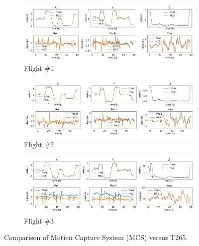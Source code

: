 \begin{figure}[!ht]
  \centering
  \begin{subfigure}[t]{.90\linewidth}
    \centering  \includegraphics[width=.99\linewidth]{chapter_7_experiments/imgs/t265_gt_graphs_flight_1.pdf}
    \caption{\label{fig:ch7_t265_a}Flight \#1}
  \end{subfigure}
  \begin{subfigure}[t]{.90\linewidth}
    \centering  \includegraphics[width=.99\linewidth]{chapter_7_experiments/imgs/t265_gt_graphs_flight_2.pdf}
    \caption{\label{fig:ch7_t265_b}Flight \#2}
  \end{subfigure}
  \begin{subfigure}[t]{.90\linewidth}
    \centering  \includegraphics[width=.99\linewidth]{chapter_7_experiments/imgs/t265_gt_graphs_flight_3.pdf}
    \caption{\label{fig:ch7_t265_c}Flight \#3}
  \end{subfigure}
  \caption[Comparison of Motion Capture System (MCS) versus T265]{Comparison of Motion Capture System (MCS) versus T265.}\label{fig:ch7_t265}
\end{figure}

